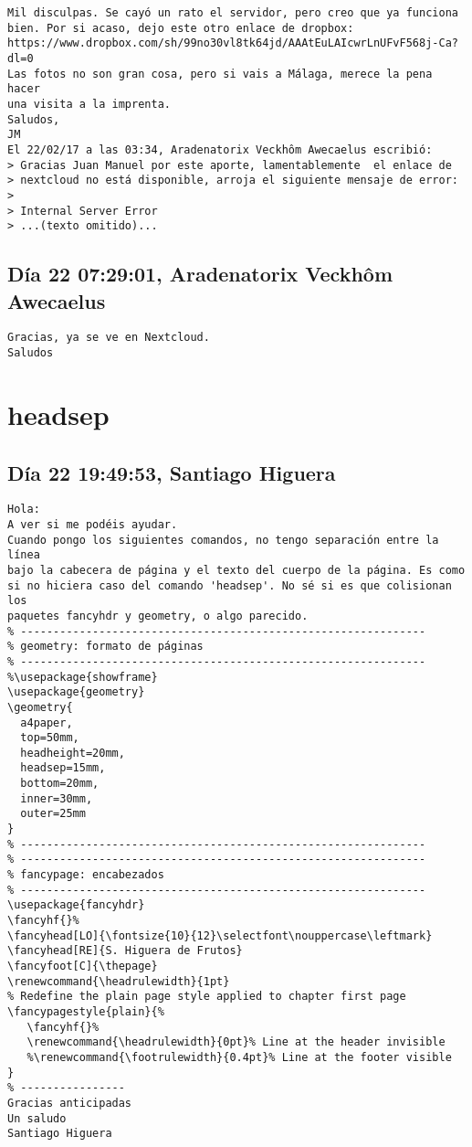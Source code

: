 \documentclass[a4paper,10pt]{article}
\begin{document}
\begin{lstlisting}
Mil disculpas. Se cayó un rato el servidor, pero creo que ya funciona 
bien. Por si acaso, dejo este otro enlace de dropbox: 
https://www.dropbox.com/sh/99no30vl8tk64jd/AAAtEuLAIcwrLnUFvF568j-Ca?dl=0
Las fotos no son gran cosa, pero si vais a Málaga, merece la pena hacer 
una visita a la imprenta.
Saludos,
JM
El 22/02/17 a las 03:34, Aradenatorix Veckhôm Awecaelus escribió:
> Gracias Juan Manuel por este aporte, lamentablemente  el enlace de
> nextcloud no está disponible, arroja el siguiente mensaje de error:
>
> Internal Server Error
> ...(texto omitido)...

\end{lstlisting}

\subsection{Día 22 07:29:01, Aradenatorix Veckhôm Awecaelus}

\begin{lstlisting}
Gracias, ya se ve en Nextcloud.
Saludos

\end{lstlisting}
\section{headsep}

\subsection{Día 22 19:49:53, Santiago Higuera}

\begin{lstlisting}
Hola:
A ver si me podéis ayudar.
Cuando pongo los siguientes comandos, no tengo separación entre la línea 
bajo la cabecera de página y el texto del cuerpo de la página. Es como 
si no hiciera caso del comando 'headsep'. No sé si es que colisionan los 
paquetes fancyhdr y geometry, o algo parecido.
% --------------------------------------------------------------
% geometry: formato de páginas
% --------------------------------------------------------------
%\usepackage{showframe}
\usepackage{geometry}
\geometry{
  a4paper,
  top=50mm,
  headheight=20mm,
  headsep=15mm,
  bottom=20mm,
  inner=30mm,
  outer=25mm
}
% --------------------------------------------------------------
% --------------------------------------------------------------
% fancypage: encabezados
% --------------------------------------------------------------
\usepackage{fancyhdr}
\fancyhf{}%
\fancyhead[LO]{\fontsize{10}{12}\selectfont\nouppercase\leftmark}
\fancyhead[RE]{S. Higuera de Frutos}
\fancyfoot[C]{\thepage}
\renewcommand{\headrulewidth}{1pt}
% Redefine the plain page style applied to chapter first page
\fancypagestyle{plain}{%
   \fancyhf{}%
   \renewcommand{\headrulewidth}{0pt}% Line at the header invisible
   %\renewcommand{\footrulewidth}{0.4pt}% Line at the footer visible
}
% ----------------
Gracias anticipadas
Un saludo
Santiago Higuera

\end{lstlisting}
\end{document}
